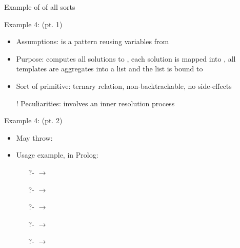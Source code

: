 \documentclass[handout]{beamer}
\begin{document}
\begin{frame}[allowframebreaks]{Example of  of all sorts}
    \begin{block}{Example 4:  \hfill (pt. 1)}
        \begin{itemize}
            \item Assumptions:  is a pattern reusing variables from 
            \item Purpose: computes all solutions to , each solution is mapped into , all templates are aggregates into a list and the list is bound to 
            \item Sort of primitive: ternary relation, non-backtrackable, no side-effects
            \item[!] Peculiarities: involves an \alert{inner} resolution process
        \end{itemize}
    \end{block}

    \begin{block}{Example 4:  \hfill (pt. 2)} 
        \begin{itemize}
            \item May throw:
            \item Usage example, in Prolog:
            \begin{itemize}
                \item[?-]  $\rightarrow$ 
                \item[?-]  $\rightarrow$ 
                \item[?-]  $\rightarrow$ 
                \item[?-]  $\rightarrow$    
                \item[?-]  $\rightarrow$ 
            \end{itemize}
        \end{itemize}
    \end{block}

    \framebreak

\end{frame}
\end{document}
